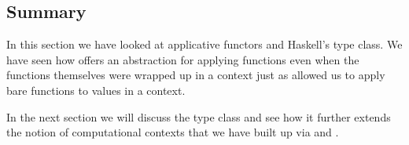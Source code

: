 \subsection{Summary}

In this section we have looked at applicative functors and Haskell's  type class. We have seen how
 offers an abstraction for applying functions even when the functions themselves were wrapped up in
a context just as  allowed us to apply bare functions to values in a context.

In the next section we will discuss the  type class and see how it further extends the notion of computational
contexts that we have built up via  and .

